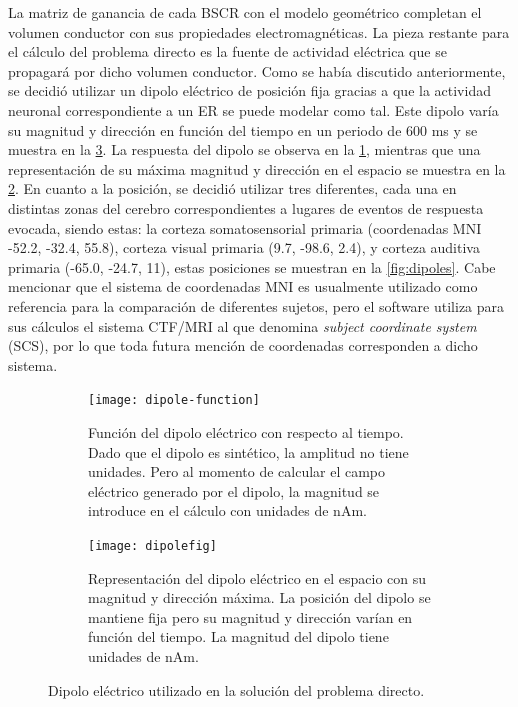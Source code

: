 La matriz de ganancia de cada BSCR con el modelo geométrico completan el volumen conductor con sus propiedades electromagnéticas.
La pieza restante para el cálculo del problema directo es la fuente de actividad eléctrica que se propagará por dicho volumen conductor.
Como se había discutido anteriormente, se decidió utilizar un dipolo eléctrico de posición fija gracias a que la actividad neuronal correspondiente a un ER se puede modelar como tal. 
Este dipolo varía su magnitud y dirección en función del tiempo en un periodo de 600 ms y se muestra en la \cref{fig:methodology:dipolefun}. 
La respuesta del dipolo se observa en la \cref{fig:methodology:dipole}, mientras que una representación de su máxima magnitud y dirección en el espacio se muestra en la \cref{fig:methodology:dipolefig}.
En cuanto a la posición, se decidió utilizar tres diferentes, cada una en distintas zonas del cerebro correspondientes a lugares de eventos de respuesta evocada, siendo estas: la corteza somatosensorial primaria (coordenadas MNI -52.2, -32.4, 55.8), corteza visual primaria (9.7, -98.6, 2.4), y corteza auditiva primaria (-65.0, -24.7, 11), estas posiciones se muestran en la \cref{fig:dipoles}.
Cabe mencionar que el sistema de coordenadas MNI es usualmente utilizado como referencia para la comparación de diferentes sujetos, pero el software utiliza para sus cálculos el sistema CTF/MRI al que denomina \emph{subject coordinate system} (SCS), por lo que toda futura mención de coordenadas corresponden a dicho sistema.

\begin{figure}[tbp]
	\centering
	\begin{subfigure}[t]{0.8\textwidth}
		\texttt{[image: dipole-function]}
		\caption{Función del dipolo eléctrico con respecto al tiempo. Dado que el dipolo es sintético, la amplitud no tiene unidades. Pero al momento de calcular el campo eléctrico generado por el dipolo, la magnitud se introduce en el cálculo con unidades de nAm.}
		\label{fig:methodology:dipole}
	\end{subfigure}
	\vspace{0.5cm} %
	\begin{subfigure}[t]{0.8\textwidth}
		\texttt{[image: dipolefig]}
		\caption{Representación del dipolo eléctrico en el espacio con su magnitud y dirección máxima. La posición del dipolo se mantiene fija pero su magnitud y dirección varían en función del tiempo. La magnitud del dipolo tiene unidades de nAm.}
		\label{fig:methodology:dipolefig}
	\end{subfigure}
	\caption{Dipolo eléctrico utilizado en la solución del problema directo.}
	\label{fig:methodology:dipolefun}
\end{figure}

